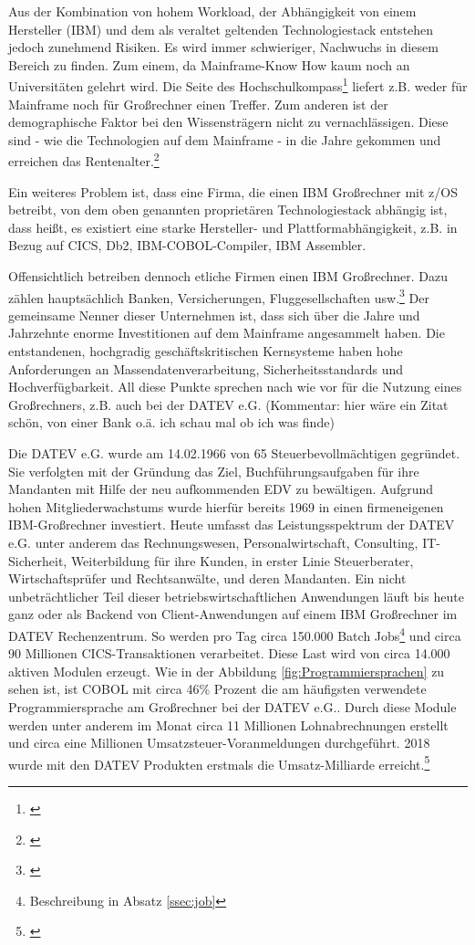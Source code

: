 Aus der Kombination von hohem Workload, der Abhängigkeit von einem Hersteller (IBM) und dem als veraltet geltenden Technologiestack entstehen jedoch zunehmend Risiken.
Es wird immer schwieriger, Nachwuchs in diesem Bereich zu finden.
Zum einem, da Mainframe-Know How kaum noch an Universitäten gelehrt wird.
Die Seite des Hochschulkompass\footnote{\cite{.09.02.2020}} liefert z.B. weder für \glqq Mainframe\grqq{} noch für \glqq Großrechner\grqq{} einen Treffer.
Zum anderen ist der demographische Faktor bei den Wissensträgern nicht zu vernachlässigen. Diese sind - wie die Technologien auf dem Mainframe - in die Jahre gekommen und erreichen das Rentenalter.\footnote{\cite{.25.2.2020f}}

Ein weiteres Problem ist, dass eine Firma, die einen IBM Großrechner mit z/OS betreibt, von dem oben genannten proprietären Technologiestack abhängig ist, dass heißt, es existiert eine starke Hersteller- und Plattformabhängigkeit, z.B. in Bezug auf CICS, Db2, IBM-COBOL-Compiler, IBM Assembler.

Offensichtlich betreiben dennoch etliche Firmen einen IBM Großrechner.
Dazu zählen hauptsächlich Banken, Versicherungen, Fluggesellschaften usw.\footnote{\cite{.25.2.2020c}}
Der gemeinsame Nenner dieser Unternehmen ist, dass sich über die Jahre und Jahrzehnte enorme Investitionen auf dem Mainframe angesammelt haben.
Die entstandenen, hochgradig geschäftskritischen Kernsysteme haben hohe Anforderungen an Massendatenverarbeitung, Sicherheitsstandards und Hochverfügbarkeit.
All diese Punkte sprechen nach wie vor für die Nutzung eines Großrechners, z.B. auch bei der DATEV e.G. (Kommentar: hier wäre ein Zitat schön, von einer Bank o.ä. ich schau mal ob ich was finde)

Die DATEV e.G. wurde am 14.02.1966 von 65 Steuerbevollmächtigen gegründet.
Sie verfolgten mit der Gründung das Ziel, Buchführungsaufgaben für ihre Mandanten mit Hilfe der neu aufkommenden EDV zu bewältigen.
Aufgrund hohen Mitgliederwachstums wurde hierfür bereits 1969 in einen firmeneigenen IBM-Großrechner investiert.\cite{.25.11.2019c}
Heute umfasst das Leistungsspektrum der DATEV e.G. unter anderem das Rechnungswesen, Personalwirtschaft, Consulting, IT-Sicherheit, Weiterbildung für ihre Kunden, in erster Linie Steuerberater, Wirtschaftsprüfer und Rechtsanwälte, und deren Mandanten.
Ein nicht unbeträchtlicher Teil dieser betriebswirtschaftlichen Anwendungen läuft bis heute ganz oder als Backend von Client-Anwendungen auf einem IBM Großrechner im DATEV Rechenzentrum.
So werden pro Tag circa 150.000 Batch Jobs\footnote{Beschreibung in Absatz \ref{ssec:job}} und circa 90 Millionen CICS-Transaktionen verarbeitet.
Diese Last wird von circa 14.000 aktiven Modulen erzeugt.
Wie in der Abbildung \ref{fig:Programmiersprachen} zu sehen ist, ist COBOL mit circa 46\% Prozent die am häufigsten verwendete Programmiersprache am Großrechner bei der DATEV e.G..
Durch diese Module werden unter anderem im Monat circa 11 Millionen Lohnabrechnungen erstellt und circa eine Millionen Umsatzsteuer-Voranmeldungen durchgeführt. 
2018 wurde mit den DATEV Produkten erstmals die Umsatz-Milliarde erreicht.\footnote{\cite{.27.2.2020b}}

